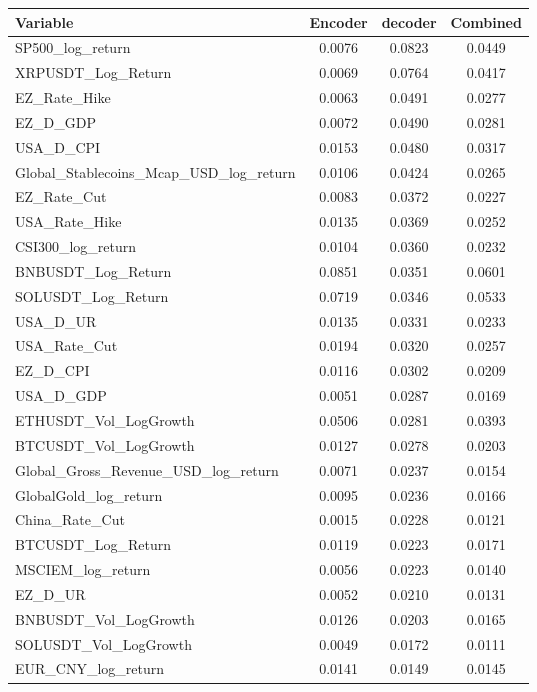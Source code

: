 \begin{tabular}{lccc}
  \toprule
  \textbf{Variable} & \textbf{Encoder} & \textbf{decoder} & \textbf{Combined} \\ 
  \midrule
  SP500\_log\_return & 0.0076 & 0.0823 & 0.0449 \\ 
  XRPUSDT\_Log\_Return & 0.0069 & 0.0764 & 0.0417 \\ 
  EZ\_Rate\_Hike & 0.0063 & 0.0491 & 0.0277 \\ 
  EZ\_D\_GDP & 0.0072 & 0.0490 & 0.0281 \\ 
  USA\_D\_CPI & 0.0153 & 0.0480 & 0.0317 \\ 
  Global\_Stablecoins\_Mcap\_USD\_log\_return & 0.0106 & 0.0424 & 0.0265 \\ 
  EZ\_Rate\_Cut & 0.0083 & 0.0372 & 0.0227 \\ 
  USA\_Rate\_Hike & 0.0135 & 0.0369 & 0.0252 \\ 
  CSI300\_log\_return & 0.0104 & 0.0360 & 0.0232 \\ 
  BNBUSDT\_Log\_Return & 0.0851 & 0.0351 & 0.0601 \\ 
  SOLUSDT\_Log\_Return & 0.0719 & 0.0346 & 0.0533 \\ 
  USA\_D\_UR & 0.0135 & 0.0331 & 0.0233 \\ 
  USA\_Rate\_Cut & 0.0194 & 0.0320 & 0.0257 \\ 
  EZ\_D\_CPI & 0.0116 & 0.0302 & 0.0209 \\ 
  USA\_D\_GDP & 0.0051 & 0.0287 & 0.0169 \\ 
  ETHUSDT\_Vol\_LogGrowth & 0.0506 & 0.0281 & 0.0393 \\ 
  BTCUSDT\_Vol\_LogGrowth & 0.0127 & 0.0278 & 0.0203 \\ 
  Global\_Gross\_Revenue\_USD\_log\_return & 0.0071 & 0.0237 & 0.0154 \\ 
  GlobalGold\_log\_return & 0.0095 & 0.0236 & 0.0166 \\ 
  China\_Rate\_Cut & 0.0015 & 0.0228 & 0.0121 \\ 
  BTCUSDT\_Log\_Return & 0.0119 & 0.0223 & 0.0171 \\ 
  MSCIEM\_log\_return & 0.0056 & 0.0223 & 0.0140 \\ 
  EZ\_D\_UR & 0.0052 & 0.0210 & 0.0131 \\ 
  BNBUSDT\_Vol\_LogGrowth & 0.0126 & 0.0203 & 0.0165 \\ 
  SOLUSDT\_Vol\_LogGrowth & 0.0049 & 0.0172 & 0.0111 \\ 
  EUR\_CNY\_log\_return & 0.0141 & 0.0149 & 0.0145 \\ 

\end{tabular}
